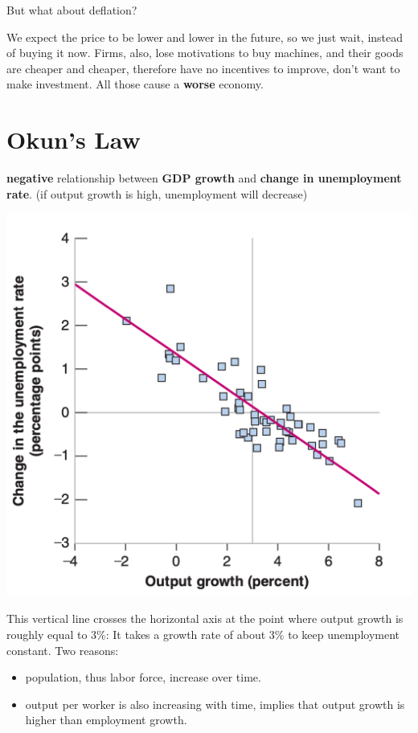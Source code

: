 \documentclass[11pt, a4paper]{ECON2123}
\begin{document}
\begin{spacing}{1.5}
    But what about deflation?

    We expect the price to be lower and lower in the future, 
    so we just wait, instead of buying it now. 
    Firms, also, lose motivations to buy machines, and 
    their goods are cheaper and cheaper, therefore have 
    no incentives to improve, don't want to make investment.
    All those cause a {\bf worse} economy.

    \section{Okun's Law}

    {\bf negative} relationship between {\bf GDP growth}
    and {\bf change in unemployment rate}. 
    (if output growth is high, unemployment will decrease)
    \begin{center}
        \includegraphics[scale=0.3]{images/0102-okun-law.png}
    \end{center}

    This vertical line crosses the horizontal axis at the 
    point where output growth is roughly equal to 3\%: 
    It takes a growth rate of about 3\% to keep unemployment 
    constant. Two reasons:
    \begin{itemize}
        \item population, thus labor force, increase over time.
        \item output per worker is also increasing with time,
        implies that output growth is higher than employment growth.
    \end{itemize}


\end{spacing}
\end{document}
